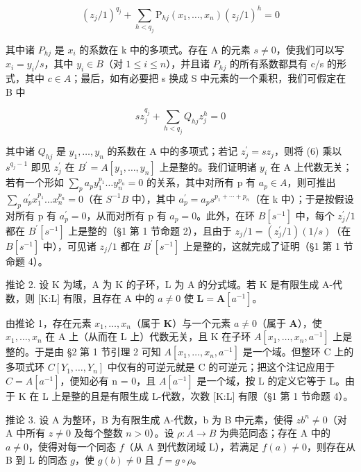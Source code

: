 \[
(z _ {j} / 1) ^ {q _ {j}} + \sum_ {h <   q _ {j}} \mathrm{P} _ {h j} (x _ {1}, \dots , x _ {n}) (z _ {j} / 1) ^ {h} = 0\tag{5}
\]

其中诸 \(P_{hj}\) 是 \(x_{i}\) 的系数在 k 中的多项式。存在 A 的元素 \(s \neq 0\)，使我们可以写 \(x_{i} = y_{i}/s\)，其中 \(y_{i} \in B\)（对 \(1 \leqslant i \leqslant n\)），并且诸 \(P_{hj}\) 的所有系数都具有 c/s 的形式，其中 \(c \in A\)；最后，如有必要把 s 换成 S 中元素的一个乘积，我们可假定在 B 中

\[
s z _ {j} ^ {q _ {j}} + \sum_ {h <   q _ {j}} Q _ {h j} z _ {j} ^ {h} = 0\tag{6}
\]

其中诸 \(Q_{hj}\) 是 \(y_{1},\ldots,y_{n}\) 的系数在 A 中的多项式；若记 \(z_{j}^{\prime}=sz_{j}\)，则将 (6) 乘以 \(s^{q_{j}-1}\) 即见 \(z_{j}^{\prime}\) 在 \(B^{\prime}=A[y_{1},\ldots,y_{n}]\) 上是整的。我们证明诸 \(y_{i}\) 在 A 上代数无关；若有一个形如 \(\sum_{p}a_{p}y_{1}^{p_{1}}\ldots y_{n}^{p_{n}}=0\) 的关系，其中对所有 p 有 \(a_{p}\in A\)，则可推出 \(\sum_{p}a_{p}^{\prime}x_{1}^{p_{1}}\ldots x_{n}^{p_{n}}=0\)（在 \(S^{-1}B\) 中），其中 \(a_{p}^{\prime}=a_{p}s^{p_{1}+\cdots+p_{n}}\)（在 k 中）；于是按假设对所有 p 有 \(a_{p}^{\prime}=0\)，从而对所有 p 有 \(a_{p}=0\)。此外，在环 \(B[s^{-1}]\) 中，每个 \(z_{j}^{\prime}/1\) 都在 \(B^{\prime}[s^{-1}]\) 上是整的（§1 第 1 节命题 2），且由于 \(z_{j}/1=(z_{j}^{\prime}/1)(1/s)\)（在 \(B[s^{-1}]\) 中），可见诸 \(z_{j}/1\) 都在 \(B^{\prime}[s^{-1}]\) 上是整的，这就完成了证明（§1 第 1 节命题 4）。

推论 2. 设 K 为域，A 为 K 的子环，L 为 A 的分式域。若 K 是有限生成 A-代数，则 {[}K:L{]} 有限，且存在 A 中的 \(a \neq 0\) 使 \(\mathbf{L} = \mathbf{A}[a^{-1}]\)。

由推论 1，存在元素 \(x_{1}, \ldots, x_{n}\)（属于 \(\mathbf{K}\)）与一个元素 \(a \neq 0\)（属于 \(\mathbf{A}\)），使 \(x_{1}, \ldots, x_{n}\) 在 A 上（从而在 L 上）代数无关，且 K 在子环 \(A[x_{1},\ldots,x_{n},a^{-1}]\) 上是整的。于是由 §2 第 1 节引理 2 可知 \(A[x_{1},\ldots,x_{n},a^{-1}]\) 是一个域。但整环 C 上的多项式环 \(C[Y_{1},\ldots,Y_{n}]\) 中仅有的可逆元就是 C 的可逆元；把这个注记应用于 \(C = A[a^{-1}]\)，便知必有 n = 0，且 \(A[a^{-1}]\) 是一个域，按 L 的定义它等于 L。由于 K 在 L 上是整的且是有限生成 L-代数，次数 {[}K:L{]} 有限（§1 第 1 节命题 4）。

推论 3. 设 A 为整环，B 为有限生成 A-代数，b 为 B 中元素，使得 \(zb^n \neq 0\)（对 A 中所有 \(z \neq 0\) 及每个整数 \(n > 0\)）。设 \(\rho: A \to B\) 为典范同态；存在 A 中的 \(a \neq 0\)，使得对每一个同态 \(f\)（从 A 到代数闭域 L），若满足 \(f(a) \neq 0\)，则存在从 B 到 L 的同态 \(g\)，使 \(g(b) \neq 0\) 且 \(f = g \circ \rho\)。

